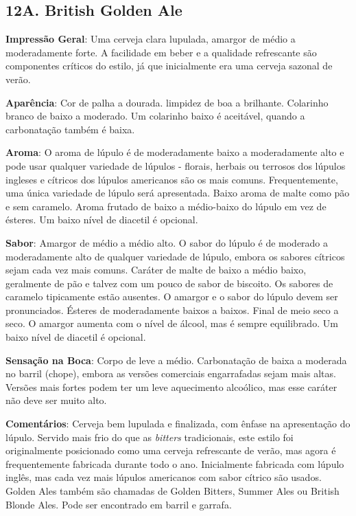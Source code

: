 \subsection*{12A. British Golden Ale}
\textbf{Impressão Geral}: Uma cerveja clara lupulada, amargor de médio a moderadamente forte. A facilidade em beber e a qualidade refrescante são componentes críticos do estilo, já que inicialmente era uma cerveja sazonal de verão.

\textbf{Aparência}: Cor de palha a dourada. limpidez de boa a brilhante. Colarinho branco de baixo a moderado. Um colarinho baixo é aceitável, quando a carbonatação também é baixa.

\textbf{Aroma}: O aroma de lúpulo é de moderadamente baixo a moderadamente alto e pode usar qualquer variedade de lúpulos - florais, herbais ou terrosos dos lúpulos ingleses e cítricos dos lúpulos americanos são os mais comuns. Frequentemente, uma única variedade de lúpulo será apresentada. Baixo aroma de malte como pão e sem caramelo. Aroma frutado de baixo a médio-baixo do lúpulo em vez de ésteres. Um baixo nível de diacetil é opcional.

\textbf{Sabor}: Amargor de médio a médio alto. O sabor do lúpulo é de moderado a moderadamente alto de qualquer variedade de lúpulo, embora os sabores cítricos sejam cada vez mais comuns. Caráter de malte de baixo a médio baixo, geralmente de pão e talvez com um pouco de sabor de biscoito. Os sabores de caramelo tipicamente estão ausentes. O amargor e o sabor do lúpulo devem ser pronunciados. Ésteres de moderadamente baixos a baixos. Final de meio seco a seco. O amargor aumenta com o nível de álcool, mas é sempre equilibrado. Um baixo nível de diacetil é opcional.

\textbf{Sensação na Boca}: Corpo de leve a médio. Carbonatação de baixa a moderada no barril (chope), embora as versões comerciais engarrafadas sejam mais altas. Versões mais fortes podem ter um leve aquecimento alcoólico, mas esse caráter não deve ser muito alto.

\textbf{Comentários}: Cerveja bem lupulada e finalizada, com ênfase na apresentação do lúpulo. Servido mais frio do que as \textit{bitters} tradicionais, este estilo foi originalmente posicionado como uma cerveja refrescante de verão, mas agora é frequentemente fabricada durante todo o ano. Inicialmente fabricada com lúpulo inglês, mas cada vez mais lúpulos americanos com sabor cítrico são usados. Golden Ales também são chamadas de Golden Bitters, Summer Ales ou British Blonde Ales. Pode ser encontrado em barril e garrafa.


